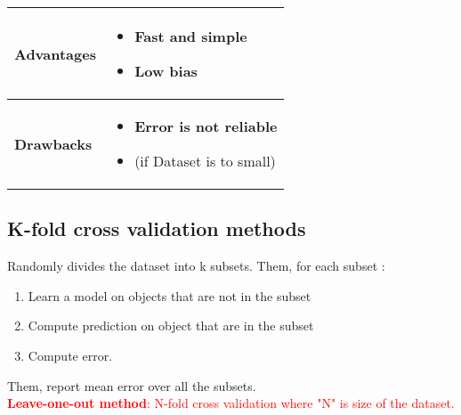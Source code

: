   \begin{table}[!h]
    \begin{center}
    \begin{tabular}{| m{8em}| m{15em}|}
    \hline
    \rowcolor{vert.g} \textbf{Advantages}     &  \begin{itemize}
                                                        \item \textbf{Fast} and \textbf{simple} 
                                                        \item \textbf{Low bias}
                                                 \end{itemize}\\ \hline 
    \rowcolor{red.g} \textbf{Drawbacks}       &  \begin{itemize}
                                                        \item \textbf{Error is not reliable}
                                                        \item (if Dataset is to small)
                                                 \end{itemize}\\ \hline
    \end{tabular}
    \end{center}
    \end{table}
    
        
\subsection{K-fold cross validation methods}
Randomly divides the dataset into k subsets. Them, for each subset :\\
\begin{enumerate}
    \item Learn a model on objects that are not in the subset
    \item Compute prediction on object that are in the subset
    \item Compute error.
\end{enumerate}
Them, report mean error over all the subsets.\\
\textcolor{red}{\textbf{Leave-one-out method}: N-fold cross validation where "N" is size of the dataset.}

